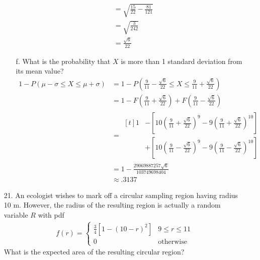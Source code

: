 \documentclass[letterpaper,12pt]{article}
\begin{document}
\begin{enumerate}
\begin{enumerate}
\begin{align*}
          &= \sqrt{\frac{15}{22} - \frac{81}{121}} \\
          &= \sqrt{\frac{3}{242}} \\
          &= \frac{\sqrt{6}}{22}
        \end{align*}
      \item[f.]
        What is the probability that $X$ is more than 1 standard deviation from its mean value?
        \begin{align*}
          1 - P(\mu - \sigma \le X \le \mu + \sigma) &= 1 - P\left(\frac{9}{11} - \frac{\sqrt{6}}{22} \le X \le \frac{9}{11} + \frac{\sqrt{6}}{22}\right) \\
          &= 1 - F\left(\frac{9}{11} + \frac{\sqrt{6}}{22}\right) + F\left(\frac{9}{11} - \frac{\sqrt{6}}{22}\right) \\
          &= \begin{aligned}[t]
            1 &- \left[10\left(\frac{9}{11} + \frac{\sqrt{6}}{22}\right)^9 - 9\left(\frac{9}{11} + \frac{\sqrt{6}}{22}\right)^{10}\right] \\
            &+ \left[10\left(\frac{9}{11} - \frac{\sqrt{6}}{22}\right)^9 - 9\left(\frac{9}{11} - \frac{\sqrt{6}}{22}\right)^{10}\right]
          \end{aligned} \\
          &= 1 - \frac{29069887257\sqrt{6}}{103749698404} \\
          &\approx .3137
        \end{align*}
    \end{enumerate}
  \item[21.]
    An ecologist wishes to mark off a circular sampling region having radius 10 m. However, the radius of the resulting region is actually a random variable $R$ with pdf
    \begin{align*}
      f(r) = \begin{cases}
        \frac{3}{4}[1 - (10 - r)^2] & 9 \le r \le 11 \\
        0                           & \text{otherwise}
      \end{cases}
    \end{align*}
    What is the expected area of the resulting circular region?
\end{enumerate}
\end{document}
